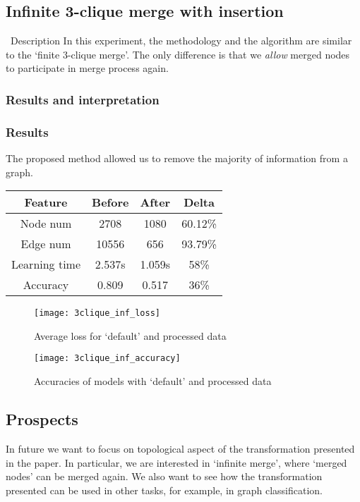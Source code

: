 \subsection{Infinite 3-clique merge with insertion}

\begin{frame}{\subsecname\ Description}
	In this experiment, the methodology and the algorithm are similar to the `finite 3-clique merge'.
	The only difference is that we \emph{allow} merged nodes to participate in merge process again.
\end{frame}

\subsubsection*{Results and interpretation}
\begin{frame}[allowframebreaks]
	\frametitle{Results}
	The proposed method allowed us to remove the majority of information from a graph.

	\centering
	\begin{tabular}{ |c|c|c|c| }
		\hline
		Feature       & Before & After  & Delta   \\
		\hline
		Node num      & 2708   & 1080   & 60.12\% \\
		Edge num      & 10556  & 656    & 93.79\% \\
		Learning time & 2.537s & 1.059s & 58\%    \\
		Accuracy      & 0.809  & 0.517  & 36\%    \\
		\hline
	\end{tabular}

	\framebreak

	\begin{figure}[h]
		\centering
		\texttt{[image: 3clique\_inf\_loss]}
		\caption{Average loss for `default' and processed data}
	\end{figure}

	\framebreak

	\begin{figure}[h]
		\centering
		\texttt{[image: 3clique\_inf\_accuracy]}
		\caption{Accuracies of models with `default' and processed data}
	\end{figure}
\end{frame}

\subsection{Prospects}
\begin{frame}{\subsecname}
	In future we want to focus on topological aspect of the transformation presented in the paper.
	In particular, we are interested in `infinite merge', where `merged nodes' can be merged again.
	We also want to see how the transformation presented can be used in other tasks, for example, in graph classification.
\end{frame}
